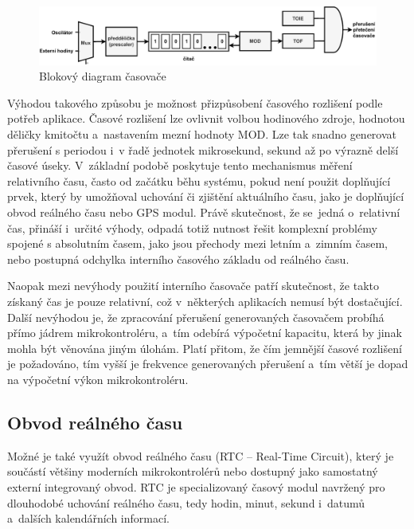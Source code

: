 \begin{figure}[h]
    \centering
    \includegraphics[width=1.00\textwidth]{obrazky-figures/timer-cz.pdf}
    
    \caption{Blokový diagram časovače~\cite{nxp_KL05_Reference_Manual}}
    \label{fig:timer}
\end{figure}

Výhodou takového způsobu je možnost přizpůsobení časového rozlišení podle potřeb aplikace. Časové rozlišení lze ovlivnit volbou hodinového zdroje, hodnotou děličky kmitočtu a~nastavením mezní hodnoty MOD. Lze tak snadno generovat přerušení s periodou i~v řadě jednotek mikrosekund, sekund až po výrazně delší časové úseky. V~základní podobě poskytuje tento mechanismus měření relativního času, často od začátku běhu systému, pokud není použit doplňující prvek, který by umožňoval uchování či zjištění aktuálního času, jako je doplňující obvod reálného času nebo GPS modul. Právě skutečnost, že se~jedná o~relativní čas, přináší i~určité výhody, odpadá totiž nutnost řešit komplexní problémy spojené s absolutním časem, jako jsou přechody mezi letním a~zimním časem, nebo postupná odchylka interního časového základu od reálného času.~\cite{perny2008zarizeni_cas_znacky}

Naopak mezi nevýhody použití interního časovače patří skutečnost, že takto získaný čas je pouze relativní, což v~některých aplikacích nemusí být dostačující. Další nevýhodou je, že zpracování přerušení generovaných časovačem probíhá přímo jádrem mikrokontroléru, a~tím odebírá výpočetní kapacitu, která by jinak mohla být věnována jiným úlohám. Platí přitom, že čím jemnější časové rozlišení je požadováno, tím vyšší je frekvence generovaných přerušení a~tím větší je dopad na výpočetní výkon mikrokontroléru.~\cite{perny2008zarizeni_cas_znacky}

\subsection{Obvod reálného času}
\label{real_time_circuit}
Možné je také využít obvod reálného času (RTC -- Real-Time Circuit), který je součástí většiny moderních mikrokontrolérů nebo dostupný jako samostatný externí integrovaný obvod. RTC je specializovaný časový modul navržený pro dlouhodobé uchování reálného času, tedy hodin, minut, sekund i~datumů a~dalších kalendářních informací.

